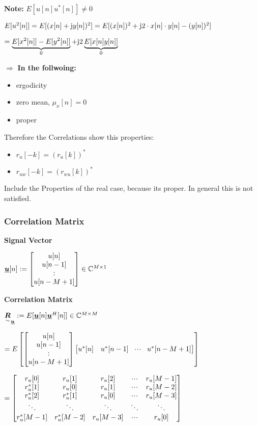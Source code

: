 \textbf{Note: } $E[u[n]u^*[n]]\neq0$

\pfeil $E[u^2[n]]=E[(x[n]+\mathrm{j} y[n])^2]=E[(x[n])^2+\mathrm{j} 2\cdot x[n]\cdot y[n]-(y[n])^2]$

\hspace{6.3cm} $=\underbrace{E[x^2[n]]-E[y^2[n]]}_0+\mathrm{j}2\underbrace{E[x[n]y[n]]}_0$

$\Rightarrow$ \textbf{In the follwoing:} 
\begin{itemize}
\item ergodicity
\item zero mean, $\mu_x[n]=0$
\item proper
\end{itemize}\bigskip

Therefore the Correlations show this properties:  
\begin{itemize}
\item $r_u[-k]=(r_u[k])^*$
\item $r_{uw}[-k]=(r_{wu}[k])^*$
\end{itemize} 
\quad Include the Properties of the real case, because its proper. In general this is not satisfied.

\subsubsection{Correlation Matrix}
\textbf{Signal Vector}

\quad$\underline{\boldsymbol {u}}[n]:=\begin{bmatrix} u[n]\\u[n-1]\\:\\u[n-M+1] \end{bmatrix} \in\mathbb{C}^{M\times 1}$

\textbf{Correlation Matrix}

\quad $\underset{\sim}{\boldsymbol {R}}_{\underline{\boldsymbol {u}}}:=E[\underline{\boldsymbol {u}}[n]\underline{\boldsymbol {u}}^H[n]] \in\mathbb{C}^{M\times M}$

\qquad $=E\left[{
\begin{bmatrix} u[n]\\u[n-1]\\:\\u[n-M+1] \end{bmatrix}
\begin{bmatrix} u^*[n]&u^*[n-1]&\!\cdot \!\cdot\!\cdot\!&u^*[n-M+1] \end{bmatrix}}\right]$
 
\qquad $=\mat{	r_u[0]& r_u[1]& r_u[2]& \shdots&r_u[M-1]\\
				r_u^*[1]& r_u[0]& r_u[1]& \shdots&r_u[M-2]\\
				r_u^*[2]& r_u^*[1]& r_u[0]& \shdots&r_u[M-3]\\
				\ddots&\ddots&\ddots&\ddots&\ddots\\
				r_u^*[M-1]& r_u^*[M-2]& r_u[M-3]& \shdots&r_u[0]}$


